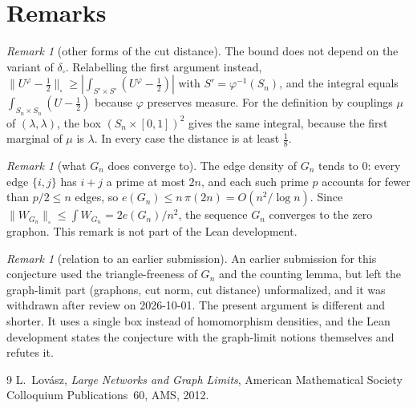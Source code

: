 \documentclass[11pt]{article}
\theoremstyle{plain}
\theoremstyle{definition}
\theoremstyle{remark}
\newtheorem{remark}[theorem]{Remark}
\newcommand{\cut}{\square}
\newcommand{\dcut}{\delta_\square}
\begin{document}
\section{Remarks}

\begin{remark}[other forms of the cut distance]\label{rem:variants}
The bound does not depend on the variant of $\dcut$. Relabelling the first
argument instead, $\|U^\varphi-\frac12\|_\cut\ge|\int_{S'\times S'}(U^\varphi-
\frac12)|$ with $S'=\varphi^{-1}(S_n)$, and the integral equals
$\int_{S_n\times S_n}(U-\frac12)$ because $\varphi$ preserves measure. For the
definition by couplings $\mu$ of $(\lambda,\lambda)$, the box
$(S_n\times[0,1])^2$ gives the same integral, because the first marginal of
$\mu$ is $\lambda$. In every case the distance is at least $\frac18$.
\end{remark}

\begin{remark}[what $G_n$ does converge to]
The edge density of $G_n$ tends to $0$: every edge $\{i,j\}$ has $i+j$ a prime
at most $2n$, and each such prime $p$ accounts for fewer than $p/2\le n$ edges,
so $e(G_n)\le n\,\pi(2n)=O(n^2/\log n)$. Since $\|W_{G_n}\|_\cut\le\int
W_{G_n}=2e(G_n)/n^2$, the sequence $G_n$ converges to the zero graphon. This
remark is not part of the Lean development.
\end{remark}

\begin{remark}[relation to an earlier submission]
An earlier submission for this conjecture used the triangle-freeness of $G_n$
and the counting lemma, but left the graph-limit part (graphons, cut norm, cut
distance) unformalized, and it was withdrawn after review on 2026-10-01. The
present argument is different and shorter. It uses a single box instead of
homomorphism densities, and the Lean development states the conjecture with the
graph-limit notions themselves and refutes it.
\end{remark}

\begin{thebibliography}{9}
 L.~Lov\'asz, \emph{Large Networks and Graph Limits},
  American Mathematical Society Colloquium Publications~60, AMS, 2012.
\end{thebibliography}
\end{document}
